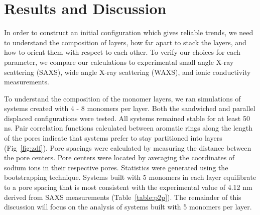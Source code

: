 \section*{Results and Discussion}

In order to construct an initial configuration which gives reliable 
trends, we need to understand the composition of layers, how far apart
to stack the layers, and how to orient them with respect to each other.
To verify our choices for each parameter, we compare our calculations
to experimental small angle X-ray scattering (SAXS), wide angle X-ray
scattering (WAXS), and ionic conductivity measurements.

To understand the composition of the monomer layers, we ran simulations of 
systems created with 4 - 8 monomers per layer. Both the sandwiched and 
parallel displaced configurations were tested. All systems remained
stable for at least 50 ns. Pair correlation functions calculated between 
aromatic rings along the length of the pores indicate that systems prefer to
stay partitioned into layers (Fig~\ref{fig:zdf}). Pore spacings were 
calculated by measuring the distance between the pore centers. Pore centers
were located by averaging the coordinates of sodium ions in their 
respective pores. Statistics were generated using the bootstrapping 
technique. Systems built with 5 monomers in each layer equilibrate to a pore
spacing that is most consistent with the experimental value of 4.12 nm
derived from SAXS measurements (Table~\ref{table:p2p}). The remainder of
this discussion will focus on the analysis of systems built with 5 
monomers per layer.

